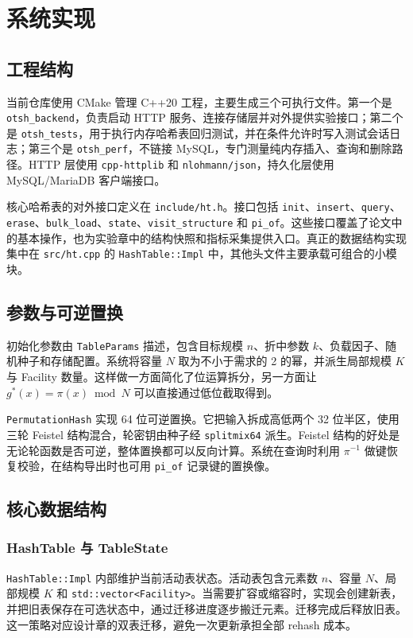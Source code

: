\chapter{系统实现}
\label{ch:impl}

\section{工程结构}
当前仓库使用 CMake 管理 C++20 工程，主要生成三个可执行文件。第一个是 \texttt{otsh\_backend}，负责启动 HTTP 服务、连接存储层并对外提供实验接口；第二个是 \texttt{otsh\_tests}，用于执行内存哈希表回归测试，并在条件允许时写入测试会话日志；第三个是 \texttt{otsh\_perf}，不链接 MySQL，专门测量纯内存插入、查询和删除路径。HTTP 层使用 \texttt{cpp-httplib}\cite{cpphttplib} 和 \texttt{nlohmann/json}\cite{nlohmannjson}，持久化层使用 MySQL/MariaDB 客户端接口\cite{mysqlmanual}。

核心哈希表的对外接口定义在 \texttt{include/ht.h}。接口包括 \texttt{init}、\texttt{insert}、\texttt{query}、\texttt{erase}、\texttt{bulk\_load}、\texttt{state}、\texttt{visit\_structure} 和 \texttt{pi\_of}。这些接口覆盖了论文中的基本操作，也为实验章中的结构快照和指标采集提供入口。真正的数据结构实现集中在 \texttt{src/ht.cpp} 的 \texttt{HashTable::Impl} 中，其他头文件主要承载可组合的小模块。

\section{参数与可逆置换}
初始化参数由 \texttt{TableParams} 描述，包含目标规模 \(n\)、折中参数 \(k\)、负载因子、随机种子和存储配置。系统将容量 \(N\) 取为不小于需求的 2 的幂，并派生局部规模 \(K\) 与 Facility 数量。这样做一方面简化了位运算拆分，另一方面让 \(g^\ast(x)=\pi(x)\bmod N\) 可以直接通过低位截取得到。

\texttt{PermutationHash} 实现 64 位可逆置换。它把输入拆成高低两个 32 位半区，使用三轮 Feistel 结构混合，轮密钥由种子经 \texttt{splitmix64} 派生。Feistel 结构的好处是无论轮函数是否可逆，整体置换都可以反向计算。系统在查询时利用 \(\pi^{-1}\) 做键恢复校验，在结构导出时也可用 \texttt{pi\_of} 记录键的置换像。

\section{核心数据结构}
\subsection{HashTable 与 TableState}
\texttt{HashTable::Impl} 内部维护当前活动表状态。活动表包含元素数 \(n\)、容量 \(N\)、局部规模 \(K\) 和 \texttt{std::vector<Facility>}。当需要扩容或缩容时，实现会创建新表，并把旧表保存在可选状态中，通过迁移进度逐步搬迁元素。迁移完成后释放旧表。这一策略对应设计章的双表迁移，避免一次更新承担全部 rehash 成本。

